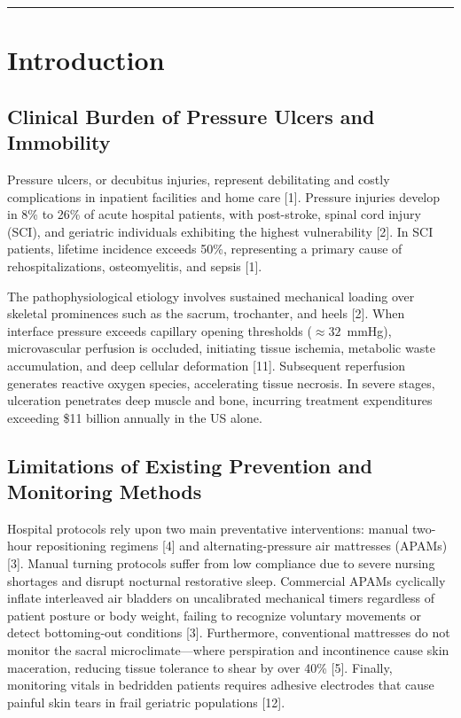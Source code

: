 ﻿\documentclass[11pt,a4paper]{article}
\begin{document}
\vspace{0.08em}
\hrule
\vspace{0.20em}

\section{Introduction}

\subsection{Clinical Burden of Pressure Ulcers and Immobility}
Pressure ulcers, or decubitus injuries, represent debilitating and costly complications in inpatient facilities and home care [1]. Pressure injuries develop in 8\% to 26\% of acute hospital patients, with post-stroke, spinal cord injury (SCI), and geriatric individuals exhibiting the highest vulnerability [2]. In SCI patients, lifetime incidence exceeds 50\%, representing a primary cause of rehospitalizations, osteomyelitis, and sepsis [1].

The pathophysiological etiology involves sustained mechanical loading over skeletal prominences such as the sacrum, trochanter, and heels [2]. When interface pressure exceeds capillary opening thresholds ($\approx 32$~mmHg), microvascular perfusion is occluded, initiating tissue ischemia, metabolic waste accumulation, and deep cellular deformation [11]. Subsequent reperfusion generates reactive oxygen species, accelerating tissue necrosis. In severe stages, ulceration penetrates deep muscle and bone, incurring treatment expenditures exceeding \$11 billion annually in the US alone.

\subsection{Limitations of Existing Prevention and Monitoring Methods}
Hospital protocols rely upon two main preventative interventions: manual two-hour repositioning regimens [4] and alternating-pressure air mattresses (APAMs) [3]. Manual turning protocols suffer from low compliance due to severe nursing shortages and disrupt nocturnal restorative sleep. Commercial APAMs cyclically inflate interleaved air bladders on uncalibrated mechanical timers regardless of patient posture or body weight, failing to recognize voluntary movements or detect bottoming-out conditions [3]. Furthermore, conventional mattresses do not monitor the sacral microclimate---where perspiration and incontinence cause skin maceration, reducing tissue tolerance to shear by over 40\% [5]. Finally, monitoring vitals in bedridden patients requires adhesive electrodes that cause painful skin tears in frail geriatric populations [12].
\end{document}

